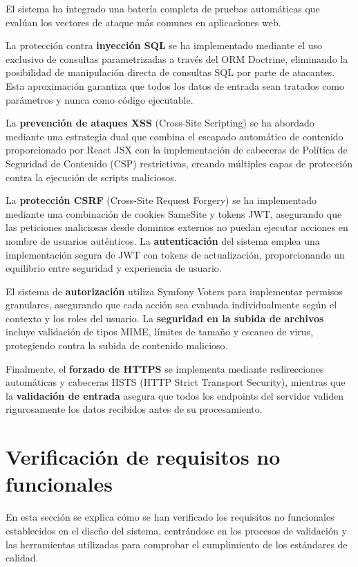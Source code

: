 \documentclass[12pt,a4paper,oneside]{report}
\begin{document}
El sistema ha integrado una batería completa de pruebas automáticas que evalúan los vectores de ataque más comunes en aplicaciones web.

La protección contra \textbf{inyección SQL} se ha implementado mediante el uso exclusivo de consultas parametrizadas a través del ORM Doctrine, eliminando la posibilidad de manipulación directa de consultas SQL por parte de atacantes. Esta aproximación garantiza que todos los datos de entrada sean tratados como parámetros y nunca como código ejecutable.

La \textbf{prevención de ataques XSS} (Cross-Site Scripting) se ha abordado mediante una estrategia dual que combina el escapado automático de contenido proporcionado por React JSX con la implementación de cabeceras de Política de Seguridad de Contenido (CSP) restrictivas, creando múltiples capas de protección contra la ejecución de scripts maliciosos.

La \textbf{protección CSRF} (Cross-Site Request Forgery) se ha implementado mediante una combinación de cookies SameSite y tokens JWT, asegurando que las peticiones maliciosas desde dominios externos no puedan ejecutar acciones en nombre de usuarios auténticos. La \textbf{autenticación} del sistema emplea una implementación segura de JWT con tokens de actualización, proporcionando un equilibrio entre seguridad y experiencia de usuario.

El sistema de \textbf{autorización} utiliza Symfony Voters para implementar permisos granulares, asegurando que cada acción sea evaluada individualmente según el contexto y los roles del usuario. La \textbf{seguridad en la subida de archivos} incluye validación de tipos MIME, límites de tamaño y escaneo de virus, protegiendo contra la subida de contenido malicioso.

Finalmente, el \textbf{forzado de HTTPS} se implementa mediante redirecciones automáticas y cabeceras HSTS (HTTP Strict Transport Security), mientras que la \textbf{validación de entrada} asegura que todos los endpoints del servidor validen rigurosamente los datos recibidos antes de su procesamiento.

\section{Verificación de requisitos no funcionales}\label{verificacion-requisitos-no-funcionales}

En esta sección se explica cómo se han verificado los requisitos no funcionales establecidos en el diseño del sistema, centrándose en los procesos de validación y las herramientas utilizadas para comprobar el cumplimiento de los estándares de calidad.
\end{document}
